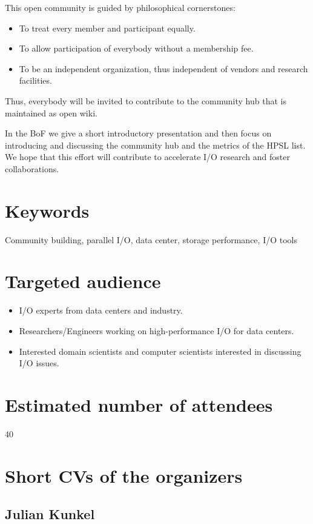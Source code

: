 \documentclass[a4paper,10pt]{article}
\begin{document}
This open community is guided by philosophical cornerstones:
\begin{itemize}
  \item To treat every member and participant equally.
  \item To allow participation of everybody without a membership fee.
  \item To be an independent organization, thus independent of vendors and research facilities.
\end{itemize}
Thus, everybody will be invited to contribute to the community hub that is maintained as open wiki.

In the BoF we give a short introductory presentation and then focus on introducing and discussing the community hub and the metrics of the HPSL list.
We hope that this effort will contribute to accelerate I/O research and foster collaborations.


\section{Keywords} 
Community building, parallel I/O, data center, storage performance, I/O tools


\section{Targeted audience}
\begin{itemize}
  \item I/O experts from data centers and industry.
  \item Researchers/Engineers working on high-performance I/O for data centers.
  \item Interested domain scientists and computer scientists interested in discussing I/O issues.
\end{itemize}


\section{Estimated number of attendees}
40

\section{Short CVs of the organizers}

\subsection{Julian Kunkel}
\end{document}
